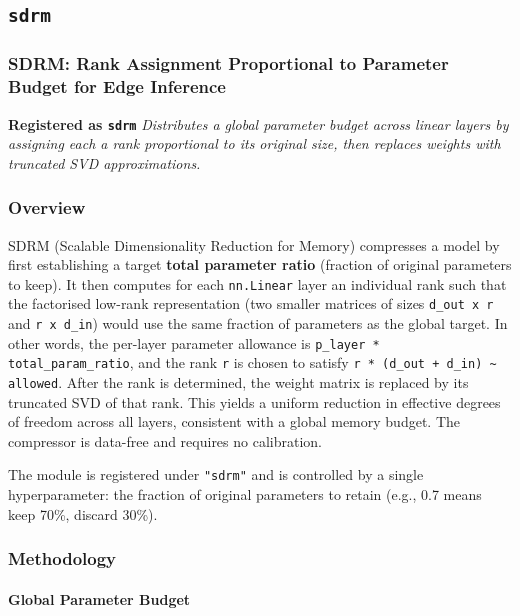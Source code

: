 \subsection{\texttt{sdrm}}
\subsubsection*{SDRM: Rank Assignment Proportional to Parameter Budget for Edge Inference}

\textbf{Registered as \texttt{sdrm}}
\textit{Distributes a global parameter budget across linear layers by assigning each a rank proportional to its original size, then replaces weights with truncated SVD approximations.}


\subsubsection*{Overview}

SDRM (Scalable Dimensionality Reduction for Memory) compresses a model by first establishing a target \textbf{total parameter ratio} (fraction of original parameters to keep). It then computes for each \texttt{nn.Linear} layer an individual rank such that the factorised low-rank representation (two smaller matrices of sizes \texttt{d\_out x r} and \texttt{r x d\_in}) would use the same fraction of parameters as the global target. In other words, the per-layer parameter allowance is \texttt{p\_layer * total\_param\_ratio}, and the rank \texttt{r} is chosen to satisfy \texttt{r * (d\_out + d\_in) \textasciitilde{} allowed}. After the rank is determined, the weight matrix is replaced by its truncated SVD of that rank. This yields a uniform reduction in effective degrees of freedom across all layers, consistent with a global memory budget. The compressor is data-free and requires no calibration.

The module is registered under \texttt{"sdrm"} and is controlled by a single hyperparameter: the fraction of original parameters to retain (e.g., 0.7 means keep 70\%, discard 30\%).


\subsubsection*{Methodology}

\paragraph{Global Parameter Budget}

